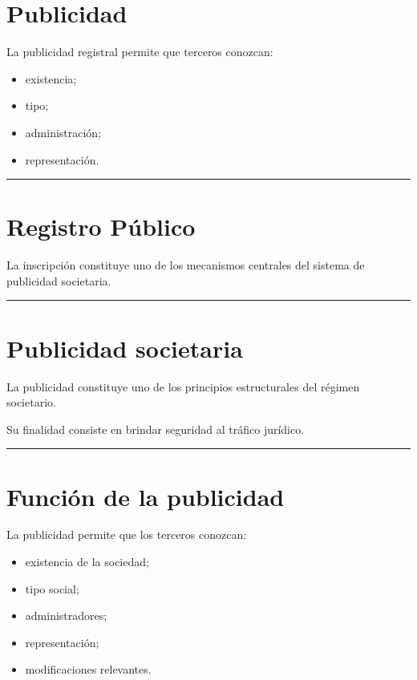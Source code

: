 \documentclass[
  spanish,
  letterpaper,
  DIV=11,
  numbers=noendperiod]{scrartcl}
\providecommand{\tightlist}{%
  \setlength{\itemsep}{0pt}\setlength{\parskip}{0pt}}
\begin{document}
\section{Publicidad}\label{publicidad}

La publicidad registral permite que terceros conozcan:

\begin{itemize}
\tightlist
\item
  existencia;
\item
  tipo;
\item
  administración;
\item
  representación.
\end{itemize}

\begin{center}\rule{0.5\linewidth}{0.5pt}\end{center}

\section{Registro Público}\label{registro-puxfablico}

La inscripción constituye uno de los mecanismos centrales del sistema de
publicidad societaria.

\begin{center}\rule{0.5\linewidth}{0.5pt}\end{center}

\section{Publicidad societaria}\label{publicidad-societaria}

La publicidad constituye uno de los principios estructurales del régimen
societario.

Su finalidad consiste en brindar seguridad al tráfico jurídico.

\begin{center}\rule{0.5\linewidth}{0.5pt}\end{center}

\section{Función de la publicidad}\label{funciuxf3n-de-la-publicidad}

La publicidad permite que los terceros conozcan:

\begin{itemize}
\tightlist
\item
  existencia de la sociedad;
\item
  tipo social;
\item
  administradores;
\item
  representación;
\item
  modificaciones relevantes.
\end{itemize}
\end{document}
